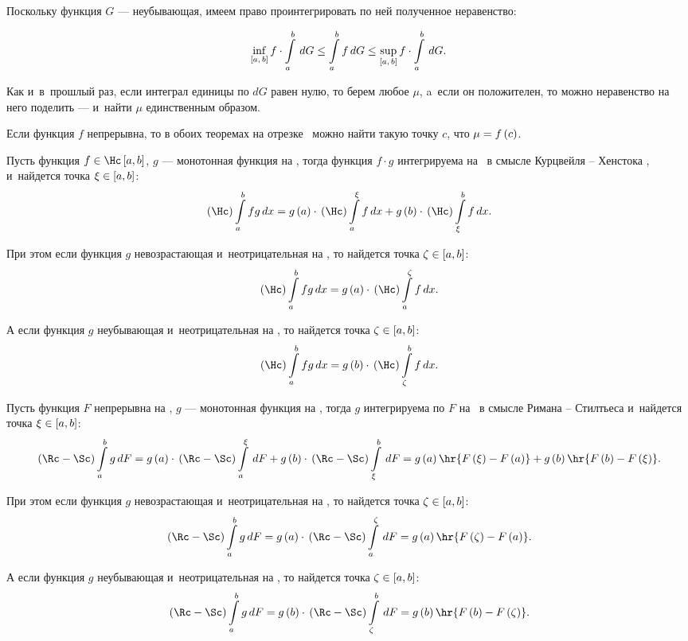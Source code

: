 \documentclass[draft]{article}
\begin{document}
Поскольку функция $G$ --- неубывающая, имеем право проинтегрировать
по ней полученное неравенство:

$$\inf\limits_{\seg[a,\,b]}f\cdot\intab ,G\le\intab f,G\le\sup\limits_{\seg[a,\,b]}f\cdot\intab ,G.$$

Как и~в~прошлый раз, если интеграл единицы по $dG$ равен нулю, то
берем любое $\mu$, a~если он положителен, то можно неравенство на
него поделить --- и~найти $\mu$ единственным образом.

\prtm

\bigskip

{\small \rem

Если функция $f$ непрерывна, то в обоих теоремах на отрезке \ab\
можно найти такую точку $c$, что $\mu=f\at(c)$.}

\bigskip


Пусть функция $f\iskurzh[a,b]$, $g$
--- монотонная функция на \ab, тогда функция $f \cdot g$ интегрируема на \ab\
в смысле Курцвейля -- Хенстока , и~найдется точка
$\xi\in\segab$:$$\kurzh\intab
fg,x=g\at(a)\cdot\kurzh\intd[a,\xi]f,x+g\at(b)\cdot\kurzh\intd[\xi,b]f,x.$$

При этом если функция $g$ невозрастающая и~неотрицательная на \ab,
то найдется точка
$\zeta\in\segab$:$$\kurzh\intd[a,b]fg,x=g\at(a)\cdot\kurzh\intd[a,\zeta]f,x.$$

А если функция $g$ неубывающая и~неотрицательная на \ab, то найдется
точка $\zeta\in\segab$:
$$\kurzh\intd[a,b]fg,x=g\at(b)\cdot\kurzh\intd[\zeta,b]f,x.$$


Пусть функция $F$ непрерывна на \ab, $g$
--- монотонная функция на \ab, тогда $g$ интегрируема по $F$ на \ab\
в смысле Римана -- Стилтьеса и~найдется точка $\xi\in\segab$:
$$\rimanst\intab g,F=g\at(a)\cdot\rimanst\intd[a,\xi] ,F+g\at(b)\cdot\rimanst\intd[\xi,b] ,F
=g\at(a)\hr{F\at(\xi)-F\at(a)}+g\at(b)\hr{F\at(b)-F\at(\xi)}.$$

При этом если функция $g$ невозрастающая и~неотрицательная на \ab,
то найдется точка
$\zeta\in\segab$:$$\rimanst\intd[a,b]g,F=g\at(a)\cdot\rimanst\intd[a,\zeta] ,F
=g\at(a)\hr{F\at(\zeta)-F\at(a)}.$$

А если функция $g$ неубывающая и~неотрицательная на \ab, то найдется
точка $\zeta\in\segab$:
$$\rimanst\intd[a,b]g,F=g\at(b)\cdot\rimanst\intd[\zeta,b] ,F
=g\at(b)\hr{F\at(b)-F\at(\zeta)}.$$

\prs
\end{document}
